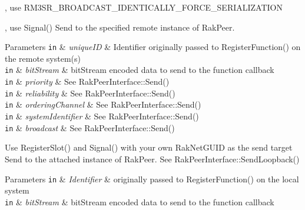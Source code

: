 \begin{DoxyRefList}
\item[\label{deprecated__deprecated000004}%
\hypertarget{deprecated__deprecated000004}{}%
Member \hyperlink{group___r_e_p_l_i_c_a___m_a_n_a_g_e_r___g_r_o_u_p3_gga993da25eb23b67455e2438971c51429ca065bb061cfc67fc94c4ddc147cd9e525}{Rak\-Net\-:\-:R\-M3\-S\-R\-\_\-\-S\-E\-R\-I\-A\-L\-I\-Z\-E\-D\-\_\-\-A\-L\-W\-A\-Y\-S\-\_\-\-I\-D\-E\-N\-T\-I\-C\-A\-L\-L\-Y} ], use R\-M3\-S\-R\-\_\-\-B\-R\-O\-A\-D\-C\-A\-S\-T\-\_\-\-I\-D\-E\-N\-T\-I\-C\-A\-L\-L\-Y\-\_\-\-F\-O\-R\-C\-E\-\_\-\-S\-E\-R\-I\-A\-L\-I\-Z\-A\-T\-I\-O\-N  
\item[\label{deprecated__deprecated000008}%
\hypertarget{deprecated__deprecated000008}{}%
Member \hyperlink{class_rak_net_1_1_r_p_c4_afcf702778c734ec2cd0a0513e77fb380}{Rak\-Net\-:\-:R\-P\-C4\-:\-:Call} (const char $\ast$unique\-I\-D, \hyperlink{class_rak_net_1_1_bit_stream}{Rak\-Net\-::\-Bit\-Stream} $\ast$bit\-Stream, Packet\-Priority priority, Packet\-Reliability reliability, char ordering\-Channel, const Address\-Or\-G\-U\-I\-D system\-Identifier, bool broadcast)], use Signal() Send to the specified remote instance of Rak\-Peer. 
\begin{DoxyParams}[1]{Parameters}
\mbox{\tt in}  & {\em unique\-I\-D} & Identifier originally passed to Register\-Function() on the remote system(s) \\
\hline
\mbox{\tt in}  & {\em bit\-Stream} & bit\-Stream encoded data to send to the function callback \\
\hline
\mbox{\tt in}  & {\em priority} & See Rak\-Peer\-Interface\-::\-Send() \\
\hline
\mbox{\tt in}  & {\em reliability} & See Rak\-Peer\-Interface\-::\-Send() \\
\hline
\mbox{\tt in}  & {\em ordering\-Channel} & See Rak\-Peer\-Interface\-::\-Send() \\
\hline
\mbox{\tt in}  & {\em system\-Identifier} & See Rak\-Peer\-Interface\-::\-Send() \\
\hline
\mbox{\tt in}  & {\em broadcast} & See Rak\-Peer\-Interface\-::\-Send()  \\
\hline
\end{DoxyParams}

\item[\label{deprecated__deprecated000007}%
\hypertarget{deprecated__deprecated000007}{}%
Member \hyperlink{class_rak_net_1_1_r_p_c4_a94a6c4503e9639d65e052a685d458878}{Rak\-Net\-:\-:R\-P\-C4\-:\-:Call\-Loopback} (const char $\ast$unique\-I\-D, \hyperlink{class_rak_net_1_1_bit_stream}{Rak\-Net\-::\-Bit\-Stream} $\ast$bit\-Stream)]Use Register\-Slot() and Signal() with your own Rak\-Net\-G\-U\-I\-D as the send target Send to the attached instance of Rak\-Peer. See Rak\-Peer\-Interface\-::\-Send\-Loopback() 
\begin{DoxyParams}[1]{Parameters}
\mbox{\tt in}  & {\em Identifier} & originally passed to Register\-Function() on the local system \\
\hline
\mbox{\tt in}  & {\em bit\-Stream} & bit\-Stream encoded data to send to the function callback  \\
\hline
\end{DoxyParams}


\end{DoxyRefList}
